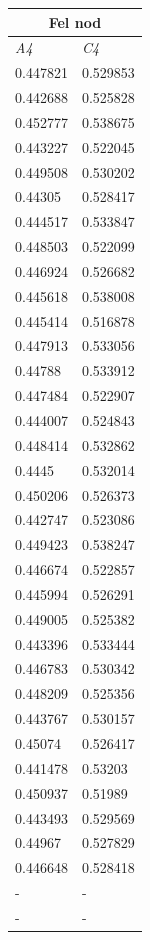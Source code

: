 \documentclass[a4paper,10pt]{article}
\begin{document}
\begin{centering}
{\begin{tabular}{| l | l| }
\hline
\multicolumn{2}{|c|}{Fel nod}\\ \hline
\emph{A4} & \emph{C4} \\ \hline
0.447821 & 0.529853 \\ \hline
0.442688 & 0.525828 \\ \hline
0.452777 & 0.538675 \\ \hline
0.443227 & 0.522045 \\ \hline
0.449508 & 0.530202 \\ \hline
0.44305  & 0.528417 \\ \hline
0.444517 & 0.533847 \\ \hline
0.448503 & 0.522099 \\ \hline
0.446924 & 0.526682 \\ \hline
0.445618 & 0.538008 \\ \hline
0.445414 & 0.516878 \\ \hline
0.447913 & 0.533056 \\ \hline
0.44788  & 0.533912 \\ \hline
0.447484 & 0.522907 \\ \hline
0.444007 & 0.524843 \\ \hline
0.448414 & 0.532862 \\ \hline
0.4445   & 0.532014 \\ \hline
0.450206 & 0.526373 \\ \hline
0.442747 & 0.523086 \\ \hline
0.449423 & 0.538247 \\ \hline
0.446674 & 0.522857 \\ \hline
0.445994 & 0.526291 \\ \hline
0.449005 & 0.525382 \\ \hline
0.443396 & 0.533444 \\ \hline
0.446783 & 0.530342 \\ \hline
0.448209 & 0.525356 \\ \hline
0.443767 & 0.530157 \\ \hline
0.45074  & 0.526417 \\ \hline
0.441478 & 0.53203  \\ \hline
0.450937 & 0.51989  \\ \hline
0.443493 & 0.529569 \\ \hline
0.44967  & 0.527829 \\ \hline\hline
0.446648 & 0.528418 \\ \hline
- & - \\ \hline
- & - \\ \hline
\end{tabular}




}
\end{centering}
\end{document}
